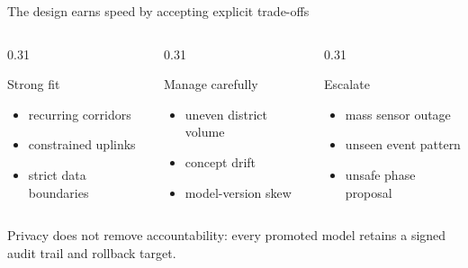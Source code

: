 \begin{frame}{The design earns speed by accepting explicit trade-offs}
  \begin{columns}[T,onlytextwidth]
    \begin{column}{0.31\textwidth}
      \begin{exampleblock}{Strong fit}
        \begin{itemize}
          \item recurring corridors
          \item constrained uplinks
          \item strict data boundaries
        \end{itemize}
      \end{exampleblock}
    \end{column}
    \begin{column}{0.31\textwidth}
      \begin{block}{Manage carefully}
        \begin{itemize}
          \item uneven district volume
          \item concept drift
          \item model-version skew
        \end{itemize}
      \end{block}
    \end{column}
    \begin{column}{0.31\textwidth}
      \begin{alertblock}{Escalate}
        \begin{itemize}
          \item mass sensor outage
          \item unseen event pattern
          \item unsafe phase proposal
        \end{itemize}
      \end{alertblock}
    \end{column}
  \end{columns}

  \vfill
  \centering
  \small
  Privacy does not remove accountability: every promoted model retains a signed audit trail and rollback target.
\end{frame}
